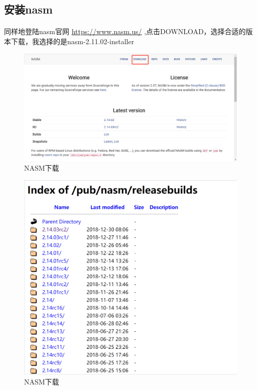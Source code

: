 \documentclass[12pt]{article}
\begin{document}
	\subsection{\Large 安装nasm}
	\paragraph{}同样地登陆nasm官网 \url{https://www.nasm.us/} ,点击DOWNLOAD，选择合适的版本下载，我选择的是nasm-2.11.02-installer
		\begin{figure}[H]
			\centering
			\includegraphics[width=14cm]{./figures/NASMD.png}
			\caption{NASM下载} 
		\end{figure}

		\begin{figure}[H]
			\centering
			\includegraphics[width=14cm]{./figures/NASMD3.png}
			\caption{NASM下载} 
		\end{figure}
\end{document}
